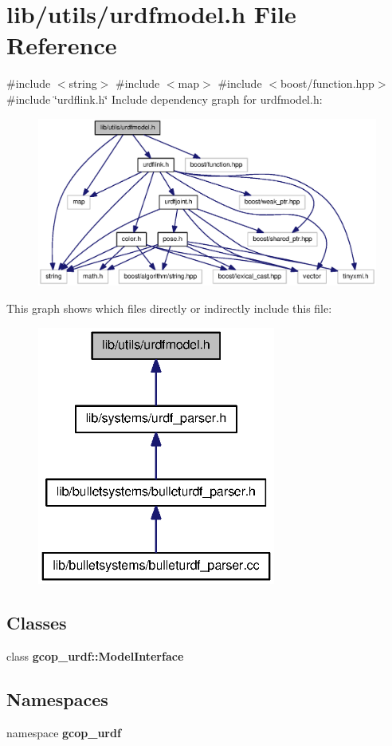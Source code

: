 \section{lib/utils/urdfmodel.h \-File \-Reference}
\label{urdfmodel_8h}
{\ttfamily \#include $<$string$>$}\*
{\ttfamily \#include $<$map$>$}\*
{\ttfamily \#include $<$boost/function.\-hpp$>$}\*
{\ttfamily \#include \char`\"{}urdflink.\-h\char`\"{}}\*
\-Include dependency graph for urdfmodel.\-h\-:\nopagebreak
\begin{figure}[H]
\begin{center}
\leavevmode
\includegraphics[width=350pt]{urdfmodel_8h__incl}
\end{center}
\end{figure}
\-This graph shows which files directly or indirectly include this file\-:
\nopagebreak
\begin{figure}[H]
\begin{center}
\leavevmode
\includegraphics[width=222pt]{urdfmodel_8h__dep__incl}
\end{center}
\end{figure}
\subsection*{\-Classes}
\begin{DoxyCompactItemize}
\item 
class {\bf gcop\-\_\-urdf\-::\-Model\-Interface}
\end{DoxyCompactItemize}
\subsection*{\-Namespaces}
\begin{DoxyCompactItemize}
\item 
namespace {\bf gcop\-\_\-urdf}
\end{DoxyCompactItemize}
